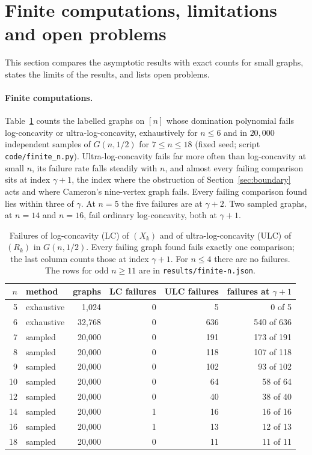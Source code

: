 \documentclass[11pt]{article}
\theoremstyle{remark}
\begin{document}
\section{Finite computations, limitations and open problems}\label{sec:finite}
This section compares the asymptotic results with exact counts for small graphs, states the limits of the results, and lists open problems.

\paragraph{Finite computations.} Table~\ref{tab:finite} counts the labelled graphs on $[n]$ whose domination polynomial fails log-concavity or ultra-log-concavity, exhaustively for $n\le6$ and in $20{,}000$ independent samples of $G(n,1/2)$ for $7\le n\le18$ (fixed seed; script \texttt{code/finite\_n.py}). Ultra-log-concavity fails far more often than log-concavity at small $n$, its failure rate falls steadily with $n$, and almost every failing comparison sits at index $\gamma+1$, the index where the obstruction of Section~\ref{sec:boundary} acts and where Cameron's nine-vertex graph fails. Every failing comparison found lies within three of $\gamma$. At $n=5$ the five failures are at $\gamma+2$. Two sampled graphs, at $n=14$ and $n=16$, fail ordinary log-concavity, both at $\gamma+1$.

\begin{table}[ht]
\centering
\begin{tabular}{rlrrrr}
\toprule
$n$ & method & graphs & LC failures & ULC failures & failures at $\gamma+1$\\
\midrule
5 & exhaustive & 1,024 & 0 & 5 & 0 of 5\\
6 & exhaustive & 32,768 & 0 & 636 & 540 of 636\\
7 & sampled & 20,000 & 0 & 191 & 173 of 191\\
8 & sampled & 20,000 & 0 & 118 & 107 of 118\\
9 & sampled & 20,000 & 0 & 102 & 93 of 102\\
10 & sampled & 20,000 & 0 & 64 & 58 of 64\\
12 & sampled & 20,000 & 0 & 40 & 38 of 40\\
14 & sampled & 20,000 & 1 & 16 & 16 of 16\\
16 & sampled & 20,000 & 1 & 13 & 12 of 13\\
18 & sampled & 20,000 & 0 & 11 & 11 of 11\\
\bottomrule
\end{tabular}
\caption{Failures of log-concavity (LC) of $(X_k)$ and of ultra-log-concavity (ULC) of $(R_k)$ in $G(n,1/2)$. Every failing graph found fails exactly one comparison; the last column counts those at index $\gamma+1$. For $n\le4$ there are no failures. The rows for odd $n\ge11$ are in \texttt{results/finite-n.json}.}
\label{tab:finite}
\end{table}
\end{document}
